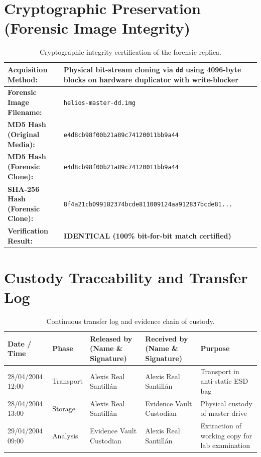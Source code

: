 \section{Cryptographic Preservation (Forensic Image Integrity)}

\begin{table}[htbp]
\centering
\small
\begin{tabularx}{\textwidth}{|l|X|}
\hline
\textbf{Acquisition Method:} & Physical bit-stream cloning via \texttt{dd} using 4096-byte blocks on hardware duplicator with write-blocker \\ \hline
\textbf{Forensic Image Filename:} & \texttt{helios-master-dd.img} \\ \hline
\textbf{MD5 Hash (Original Media):} & \texttt{e4d8cb98f00b21a89c74120011bb9a44} \\ \hline
\textbf{MD5 Hash (Forensic Clone):} & \texttt{e4d8cb98f00b21a89c74120011bb9a44} \\ \hline
\textbf{SHA-256 Hash (Forensic Clone):} & \texttt{8f4a21cb099182374bcde811009124aa912837bcde81...} \\ \hline
\textbf{Verification Result:} & \textbf{IDENTICAL (100\% bit-for-bit match certified)} \\ \hline
\end{tabularx}
\caption{Cryptographic integrity certification of the forensic replica.}
\end{table}

\section{Custody Traceability and Transfer Log}

\begin{table}[htbp]
\centering
\scriptsize
\begin{tabularx}{\textwidth}{|l|l|X|X|p{2.2cm}|}
\hline
\textbf{Date / Time} & \textbf{Phase} & \textbf{Released by (Name \& Signature)} & \textbf{Received by (Name \& Signature)} & \textbf{Purpose} \\ \hline
28/04/2004 12:00 & Transport & Alexis Real Santillán & Alexis Real Santillán & Transport in anti-static ESD bag \\ \hline
28/04/2004 13:00 & Storage & Alexis Real Santillán & Evidence Vault Custodian & Physical custody of master drive \\ \hline
29/04/2004 09:00 & Analysis & Evidence Vault Custodian & Alexis Real Santillán & Extraction of working copy for lab examination \\ \hline
\end{tabularx}
\caption{Continuous transfer log and evidence chain of custody.}
\end{table}
